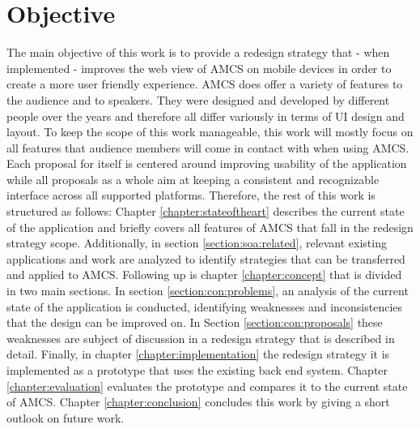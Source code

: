 \section{Objective}
\label{section:intro:objective}
The main objective of this work is to provide a redesign strategy that - when implemented - improves the web view of AMCS on mobile devices in order to create a more user friendly experience. AMCS does offer a variety of features to the audience and to speakers. They were designed and developed by different people over the years and therefore all differ  variously in terms of UI design and layout.
To keep the scope of this work manageable, this work will mostly focus on all features that audience members will come in contact with when using AMCS.
Each proposal for itself is centered around improving usability of the application while all proposals as a whole aim at keeping a consistent and recognizable interface across all supported platforms.  Therefore, the rest of this work is structured as follows:
\newline
\newline
Chapter \ref{chapter:stateoftheart} describes the current state of the application and briefly covers all features of AMCS that fall in the redesign strategy scope.
Additionally, in section \ref{section:soa:related}, relevant existing applications and work are analyzed to identify strategies that can be transferred and applied to AMCS.
\newline
\newline
Following up is chapter \ref{chapter:concept} that is divided in two main sections. In section \ref{section:con:problems}, an analysis of the current state of the application is conducted, identifying weaknesses and inconsistencies that the design can be improved on.
In Section \ref{section:con:proposals} these weaknesses are subject of discussion in a redesign strategy that is described in detail.
\newline
\newline
Finally, in chapter \ref{chapter:implementation} the redesign strategy it is implemented as a prototype that uses the existing back end system.
Chapter \ref{chapter:evaluation} evaluates the prototype and compares it to the current state of AMCS.
\newline
\newline
Chapter \ref{chapter:conclusion} concludes this work by giving a short outlook on future work.
